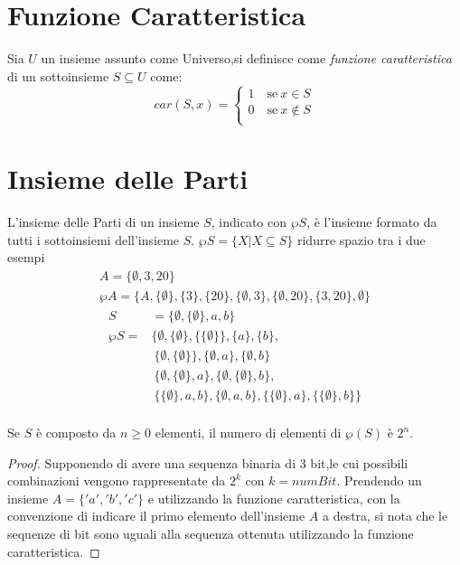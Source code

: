 \section{Funzione Caratteristica}
Sia $U$ un insieme assunto come Universo,si definisce come \emph{funzione caratteristica}
di un sottoinsieme $S \subseteq U$ come:
\begin{equation*}
    car(S,x) = \begin{cases} 1 \quad \text{se} \ x \in S \\
                             0 \quad \text{se} \ x \not \in S\\
               \end{cases}
\end{equation*}

\section{Insieme delle Parti}
L'insieme delle Parti di un insieme $S$, indicato con $\wp S$, è l'insieme formato
da tutti i sottoinsiemi dell'insieme $S$. \newline
$\wp S = \{X | X \subseteq S\} $
ridurre spazio tra i due esempi
\begin{align*}
A = \{\emptyset,3,20 \} \\
\wp A = \{A,\{\emptyset\},\{ 3\},\{ 20 \},\{ \emptyset,3 \},\{\emptyset,20 \},\{3,20\},\emptyset \} 
\end{align*}
\begin{align*}
S & = \{ \emptyset, \{ \emptyset \}, a,b\} \\
\wp S = & \{ \emptyset,\{\emptyset \},\{\{\emptyset\}\},\{a\},\{b\}, \\
        & \ \{ \emptyset,\{\emptyset\}\}, \{ \emptyset,a\},\{ \emptyset,b\} \\
        & \ \{ \emptyset,\{\emptyset\},a\},\{\emptyset,\{\emptyset\},b\}, \\
        & \ \{ \{\emptyset\},a,b\},\{ \emptyset,a,b\},\{\{\emptyset\},a\},\{\{\emptyset\},b\} \} \\
\end{align*}

\begin{defi}
    Se $S$ è composto da $n \geq 0$ elementi, il numero di elementi di $\wp(S)$ è $2 ^ n$.
\end{defi}
\begin{proof}
Supponendo di avere una sequenza binaria di 3 bit,le cui possibili combinazioni
vengono rappresentate da $2 ^ k$ con $k = numBit$.\newline
Prendendo un insieme $A = \{'a','b','c' \}$ e utilizzando la funzione caratteristica,
con la convenzione di indicare il primo elemento dell'insieme $A$ a destra, si nota
che le sequenze di bit sono uguali alla sequenza ottenuta utilizzando la funzione caratteristica.
\end{proof}

